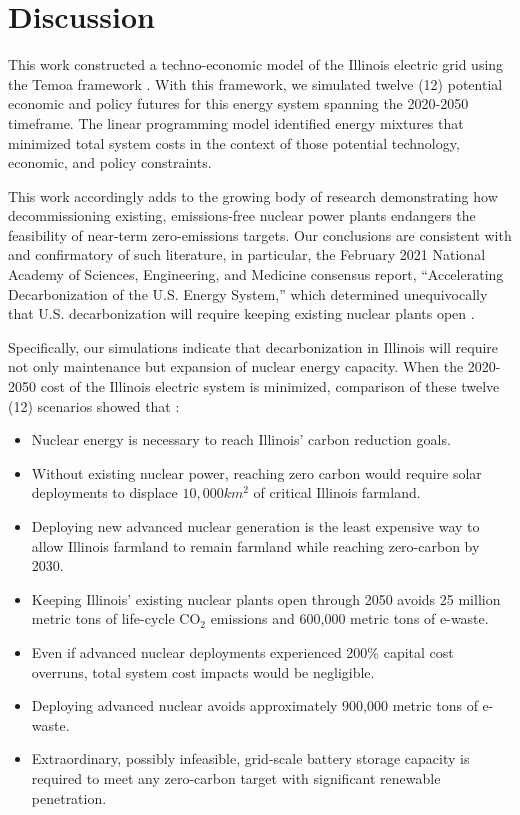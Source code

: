 \section{Discussion}\label{sec:discussion}
This work constructed a techno-economic model of the Illinois electric grid 
using the Temoa framework \cite{decarolis_modelling_2016}. With this framework, 
we simulated twelve (12) potential economic and policy futures for this energy 
system spanning the 2020-2050 timeframe. The linear programming model 
identified energy mixtures that minimized total system costs 
in the context of those potential technology, economic, and policy constraints.

This work accordingly adds to the growing body of research demonstrating how 
decommissioning existing, emissions-free nuclear power plants endangers the 
feasibility of near-term zero-emissions targets.  Our conclusions are 
consistent with and confirmatory of such literature, in particular, the 
February 2021 National Academy of Sciences, Engineering, and Medicine consensus 
report, ``Accelerating Decarbonization of the U.S. Energy System,'' which determined unequivocally that U.S. decarbonization will require keeping existing nuclear plants open
\cite{national_academies_of_sciences_engineering_and_medicine_2021_accelerating_2021}.

Specifically, our simulations indicate that decarbonization
in Illinois will require not only maintenance but expansion of nuclear energy capacity.
When the 2020-2050 cost of the Illinois electric system is minimized, 
comparison of these twelve (12) scenarios showed that :

\begin{itemize}
        \item Nuclear energy is necessary to reach Illinois' carbon reduction
                goals.
        \item Without existing nuclear power, reaching zero carbon would
                require solar deployments to displace $10,000km^2$ of critical
                Illinois
                farmland.
        \item Deploying new advanced nuclear generation is the least expensive way to
                allow Illinois farmland to remain farmland while reaching
                zero-carbon by 2030.
        \item Keeping Illinois' existing nuclear plants open through
                2050 avoids 25 million metric tons of life-cycle CO$_2$
                emissions and 600,000 metric tons of e-waste.
        \item Even if advanced nuclear deployments experienced 200\% capital
                cost overruns, total system cost impacts would be negligible.
        \item Deploying advanced nuclear avoids approximately 900,000 metric
                tons of e-waste.
        \item Extraordinary, possibly infeasible, grid-scale battery storage capacity
                is required to meet any zero-carbon target with significant renewable
                penetration.
\end{itemize}
